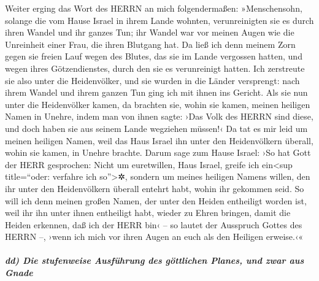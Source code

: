 Weiter erging das Wort des HERRN an mich folgendermaßen:
»Menschensohn, solange die vom Hause Israel in ihrem
Lande wohnten, verunreinigten sie es durch ihren Wandel und ihr ganzes
Tun; ihr Wandel war vor meinen Augen wie die Unreinheit einer Frau, die
ihren Blutgang hat. Da ließ ich denn meinem Zorn gegen
sie freien Lauf wegen des Blutes, das sie im Lande vergossen hatten, und
wegen ihres Götzendienstes, durch den sie es verunreinigt hatten.
Ich zerstreute sie also unter die Heidenvölker, und sie
wurden in die Länder versprengt: nach ihrem Wandel und ihrem ganzen Tun
ging ich mit ihnen ins Gericht. Als sie nun unter die
Heidenvölker kamen, da brachten sie, wohin sie kamen, meinen heiligen
Namen in Unehre, indem man von ihnen sagte: ›Das Volk des HERRN sind
diese, und doch haben sie aus seinem Lande wegziehen müssen!‹
Da tat es mir leid um meinen heiligen Namen, weil das
Haus Israel ihn unter den Heidenvölkern überall, wohin sie kamen, in
Unehre brachte. Darum sage zum Hause Israel: ›So hat Gott
der HERR gesprochen: Nicht um euretwillen, Haus Israel, greife ich
ein\textless sup title=``oder: verfahre ich so''\textgreater✲, sondern
um meines heiligen Namens willen, den ihr unter den Heidenvölkern
überall entehrt habt, wohin ihr gekommen seid. So will
ich denn meinen großen Namen, der unter den Heiden entheiligt worden
ist, weil ihr ihn unter ihnen entheiligt habt, wieder zu Ehren bringen,
damit die Heiden erkennen, daß ich der HERR bin‹ -- so lautet der
Ausspruch Gottes des HERRN --, ›wenn ich mich vor ihren Augen an euch
als den Heiligen erweise.‹«

\hypertarget{dd-die-stufenweise-ausfuxfchrung-des-guxf6ttlichen-planes-und-zwar-aus-gnade}{%
\subparagraph{dd) Die stufenweise Ausführung des göttlichen Planes, und
zwar aus
Gnade}\label{dd-die-stufenweise-ausfuxfchrung-des-guxf6ttlichen-planes-und-zwar-aus-gnade}}

